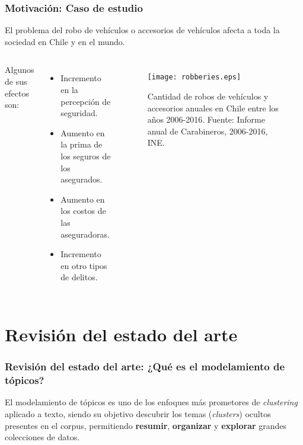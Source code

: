 \documentclass[
	spanish, %
	aspectratio=43, %
	hyperref={pdfencoding=auto,psdextra},
	xcolor={dvipsnames,table,usenames},
]{beamer}
\begin{document}
\begin{frame}[t]
\frametitle{Motivación: Caso de estudio} 

El problema del robo de vehículos o accesorios de vehículos afecta a toda la sociedad en Chile y en el mundo. 
\begin{columns}

Algunos de sus efectos son:
  \begin{itemize}
    \item Incremento en la percepción de seguridad.
    \item Aumento en la prima de los seguros de los asegurados.
    \item Aumento en los costos de las aseguradoras.
    \item Incremento en otro tipos de delitos.
  \end{itemize}
 
\begin{figure}
    \texttt{[image: robberies.eps]} 
    \caption{Cantidad de robos de vehículos y accesorios anuales en Chile entre los años 2006-2016. Fuente: Informe anual de Carabineros, 2006-2016, INE.} 
    \label{fig:antecedente}
\end{figure}

\end{columns}
\end{frame}


\section{Revisión del estado del arte}

\begin{frame}[t]
\frametitle{Revisión del estado del arte: ¿Qué es el modelamiento de tópicos?}
El modelamiento de tópicos es uno de los enfoques más prometores de \textit{clustering} aplicado a texto, siendo su objetivo descubrir los temas (\textit{clusters}) ocultos presentes en el corpus, permitiendo \textbf{resumir}, \textbf{organizar} y \textbf{explorar} grandes colecciones de datos.

\begin{figure}
\end{figure}

\end{frame}
\end{document}
